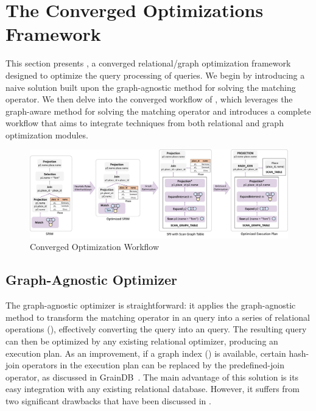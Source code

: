 \section{The Converged Optimizations Framework}
\label{sec:optimizations}

This section presents \name, a converged relational/graph optimization framework designed to optimize the query
processing of \spjm queries. We begin by introducing a naive solution built upon the graph-agnostic
method for solving the matching operator. We then delve into the converged workflow of \name, which leverages the graph-aware method for solving the matching operator and introduces a complete workflow that aims to integrate techniques from both relational and graph optimization modules.



\begin{figure}
    \centering
    \includegraphics[width=\linewidth]{./figures/workflow.pdf}
    \caption{Converged Optimization Workflow}
    \label{fig:framework-workflow}
\end{figure}


\subsection{Graph-Agnostic Optimizer}
\label{sec:relational-only}
The graph-agnostic optimizer is straightforward: it applies the graph-agnostic method to transform the matching operator in an \spjm query into a series of relational operations (), effectively converting the \spjm query into an \spj query. The resulting \spj query can then be optimized by any existing relational optimizer, producing an execution plan. As an improvement, if a graph index () is available, certain hash-join operators in the execution plan can be replaced by the predefined-join operator, as discussed in GrainDB~\cite{graindb}. The main advantage of this solution is its easy integration with any existing relational database. However, it suffers from two significant drawbacks that have been discussed in .

